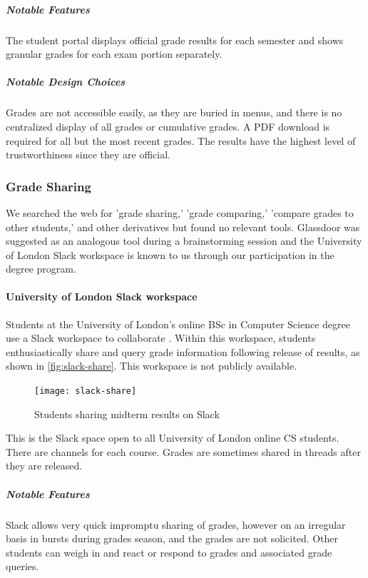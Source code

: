 \subparagraph{Notable Features}
The student portal displays official grade results for each semester and shows granular grades for each exam portion separately.

\subparagraph{Notable Design Choices}
Grades are not accessible easily, as they are buried in menus, and there is no centralized display of all grades or cumulative grades. A PDF download is required for all but the most recent grades. The results have the highest level of trustworthiness since they are official.

\subsubsection{Grade Sharing}

We searched the web for 'grade sharing,' 'grade comparing,' 'compare grades to other students,' and other derivatives but found no relevant tools. Glassdoor was suggested as an analogous tool during a brainstorming session and the University of London Slack workspace is known to us through our participation in the degree program.

\paragraph{University of London Slack workspace}

Students at the University of London's online BSc in Computer Science degree use a Slack workspace to collaborate \cite{slack}. Within this workspace, students enthusiastically share and query grade information following release of results, as shown in \autoref{fig:slack-share}. This workspace is not publicly available.

\begin{figure}[H]
\noindent \texttt{[image: slack-share]}
\centering
\caption{Students sharing midterm results on Slack}
\label{fig:slack-share}
\end{figure}

\noindent This is the Slack space open to all University of London online CS students. There are channels for each course. Grades are sometimes shared in threads after they are released.
\bigskip

\subparagraph{Notable Features}
Slack allows very quick impromptu sharing of grades, however on an irregular basis in bursts during grades season, and the grades are not solicited. Other students can weigh in and react or respond to grades and associated grade queries.

